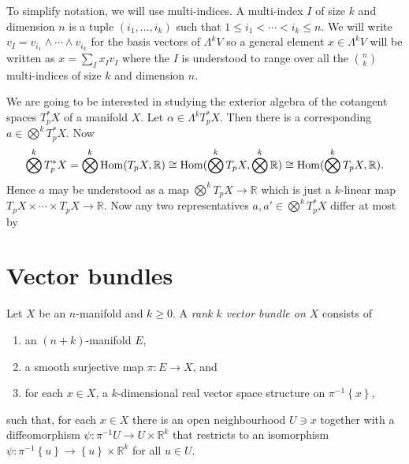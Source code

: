 \documentclass{article}
\begin{document}
To simplify notation, we will use multi-indices. A multi-index $I$ of size
$k$ and dimension $n$ is a tuple $(i_1,\ldots,i_k)$ such that
$1\leq i_1<\cdots<i_k\leq n$. We will write $v_I = v_{i_1}\wedge \cdots \wedge
v_{i_k}$ for the basis vectors of $\Lambda^k V$ so a general
element $x\in\Lambda^k V$ will be written as
$x = \sum_I x_I v_I$ where the $I$ is understood to range over
all the $\binom{n}{k}$ multi-indices of size $k$ and dimension $n$.

\begin{example}
  We are going to be interested in studying the exterior
  algebra of the cotangent spaces $T_p^* X$ of a manifold $X$.
  Let $\alpha\in \Lambda^k T^*_p X$. Then there is a corresponding $a\in
  \bigotimes^k T_p^* X$. Now
  \begin{align*}
    \bigotimes^k T_p^* X = \bigotimes^k \operatorname{Hom}(T_p X,\mathbb{R}) \cong \operatorname{Hom}(\bigotimes^k T_p X, \bigotimes^k \mathbb{R}) \cong \operatorname{Hom}(\bigotimes^k T_p X,\mathbb{R}).
  \end{align*}
  Hence $a$ may be understood as a map $\bigotimes^k T_p X\to\mathbb{R}$
  which is just a $k$-linear map $T_p X\times\cdots\times T_p X\to\mathbb{R}$. Now any two representatives $a,a'\in\bigotimes^k T_p^* X$ differ
  at most by
\end{example}

\section{Vector bundles}

\begin{definition}
  Let $X$ be an $n$-manifold and $k\geq 0$.
  A \emph{rank $k$ vector bundle on $X$} consists of
  \begin{enumerate}
    \item an $(n+k)$-manifold $E$,
    \item a smooth surjective map $\pi : E\to X$, and
    \item for each $x\in X$, a $k$-dimensional real vector space structure on ${\pi}^{-1}\left\lbrace{x}\right\rbrace$,
  \end{enumerate}
  such that, for each $x\in X$ there is an open neighbourhood $U\ni x$
  together with a diffeomorphism $\psi : {\pi}^{-1} U \to U\times\mathbb{R}^k$ that restricts to an isomorphism $\psi : {\pi}^{-1}\left\lbrace{u}\right\rbrace\to \left\lbrace{u}\right\rbrace\times\mathbb{R}^k$ for all $u\in U$.
\end{definition}
\end{document}

